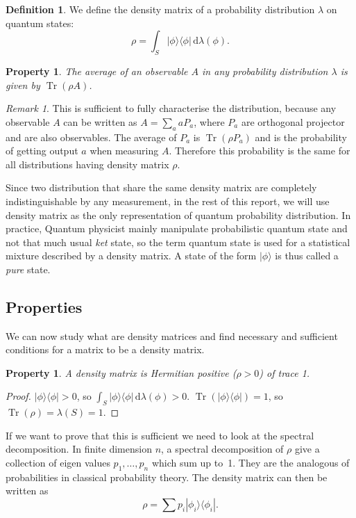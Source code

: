 \documentclass[10pt,a4paper]{report}
\theoremstyle{plain}
\newtheorem{prop}[thm]{Property}
\theoremstyle{definition}
\newtheorem{defn}{Definition}[chapter]
\theoremstyle{remark}
\newtheorem*{rem}{Remark}
\newcommand{\ket}[1]{|#1\rangle}
\newcommand{\bra}[1]{\langle#1|}
\newcommand{\dd}{\mathrm{d}}
\DeclareMathOperator{\Tr}{Tr}
\begin{document}
\begin{defn} We define the density matrix of a probability distribution $\lambda$ on
  quantum states:
  \[ \rho = \int_S \ket \phi \bra \phi \,\dd\lambda(\phi) .\]
\end{defn}
\begin{prop}
  The average of an observable $A$ in any probability distribution $\lambda$ is
  given by $\Tr(\rho A)$.
\end{prop}

\begin{rem} This is sufficient to fully characterise the distribution, because
 any observable $A$ can be written as $A = \sum_a aP_a$, where $P_a$ are orthogonal
 projector and are also observables. The average of $P_a$ is $\Tr(\rho P_a)$ and
 is the probability
 of getting output $a$ when measuring $A$. Therefore this probability is the same for
 all distributions having density matrix $\rho$.
\end{rem}

Since two distribution that share the same
density matrix are completely indistinguishable by any measurement, in the rest
of this report, we will use density matrix as the only
representation of quantum probability distribution. In practice,
Quantum physicist mainly manipulate probabilistic quantum state and not that
much usual \emph{ket} state, so the term quantum state is used for a statistical
mixture described by a density matrix. A state of the form $\ket \phi$ is thus
called a \emph{pure} state.

\subsection{Properties}

We can now study what are density matrices and find necessary and sufficient
conditions for a matrix to be a density matrix.

\begin{prop}\label{prop:dens}
  A density matrix is Hermitian positive ($\rho > 0$) of trace 1.
\end{prop}

\begin{proof}
  $\ket \phi \bra \phi > 0$, so $ \int_S \ket \phi \bra \phi \,\dd\lambda(\phi)
  > 0$.
  $\Tr(\ket \phi \bra \phi) = 1$, so $\Tr(\rho) = \lambda(S) = 1$.
\end{proof}

If we want to prove that this is sufficient we need to look at the spectral
decomposition.
In finite dimension $n$, a spectral decomposition of $\rho$ give a
collection of eigen values $p_1, \ldots, p_n$ which sum up to~1. They are the
analogous of probabilities in classical probability theory. The density matrix
can then be written as
\[\rho = \sum p_i \ket {\phi_i} \bra {\phi_i}.\]
\end{document}
